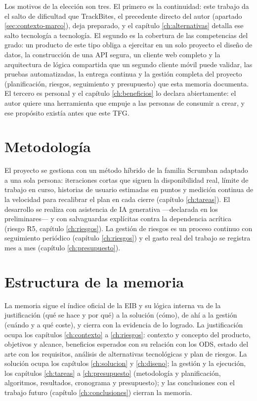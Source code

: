 Los motivos de la elección son tres.
El primero es la continuidad: este trabajo da el salto de dificultad que TrackBites, el precedente directo del autor (apartado \ref{sec:contexto-marco}), deja preparado, y el capítulo \ref{ch:alternativas} detalla ese salto tecnología a tecnología.
El segundo es la cobertura de las competencias del grado: un producto de este tipo obliga a ejercitar en un solo proyecto el diseño de datos, la construcción de una \ac{API} segura, un cliente web completo y la arquitectura de lógica compartida que un segundo cliente móvil puede validar, las pruebas automatizadas, la entrega continua y la gestión completa del proyecto (planificación, riesgos, seguimiento y presupuesto) que esta memoria documenta.
El tercero es personal y el capítulo \ref{ch:beneficios} lo declara abiertamente: el autor quiere una herramienta que empuje a las personas de consumir a crear, y ese propósito existía antes que este \ac{TFG}.

\section{Metodología}
\label{sec:intro-metodologia}

El proyecto se gestiona con un método híbrido de la familia Scrumban adaptado a una sola persona: iteraciones cortas que siguen la disponibilidad real, límite de trabajo en curso, historias de usuario estimadas en puntos y medición continua de la velocidad para recalibrar el plan en cada cierre (capítulo \ref{ch:tareas}).
El desarrollo se realiza con asistencia de \ac{IA} generativa —declarada en los preliminares— y con salvaguardas explícitas contra la dependencia acrítica (riesgo R5, capítulo \ref{ch:riesgos}).
La gestión de riesgos es un proceso continuo con seguimiento periódico (capítulo \ref{ch:riesgos}) y el gasto real del trabajo se registra mes a mes (capítulo \ref{ch:presupuesto}).

\section{Estructura de la memoria}
\label{sec:intro-estructura}

La memoria sigue el índice oficial de la \ac{EIB} y su lógica interna va de la justificación (qué se hace y por qué) a la solución (cómo), de ahí a la gestión (cuándo y a qué coste), y cierra con la evidencia de lo logrado.
La justificación ocupa los capítulos \ref{ch:contexto} a \ref{ch:riesgos}: contexto y concepto del producto, objetivos y alcance, beneficios esperados con su relación con los \ac{ODS}, estado del arte con los requisitos, análisis de alternativas tecnológicas y plan de riesgos.
La solución ocupa los capítulos \ref{ch:solucion} y \ref{ch:diseno}; la gestión y la ejecución, los capítulos \ref{ch:tareas} a \ref{ch:presupuesto} (metodología y planificación, algoritmos, resultados, cronograma y presupuesto); y las conclusiones con el trabajo futuro (capítulo \ref{ch:conclusiones}) cierran la memoria.
